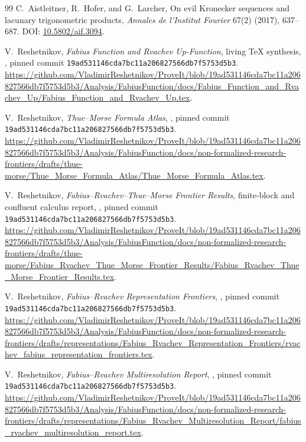 \documentclass[11pt,oneside]{article}
\theoremstyle{definition}
\begin{document}
\begin{thebibliography}{99}
C.~Aistleitner, R.~Hofer, and G.~Larcher,
\newblock On evil Kronecker sequences and lacunary trigonometric products,
\newblock \emph{Annales de l'Institut Fourier} 67(2) (2017), 637--687.
\newblock DOI: \href{https://doi.org/10.5802/aif.3094}{10.5802/aif.3094}.

V.~Reshetnikov,
\newblock \emph{Fabius Function and Rvachev Up-Function}, living TeX synthesis,
\newblock \repo, pinned commit
\nolinkurl{19ad531146cda7bc11a206827566db7f5753d5b3}.
\newblock \url{https://github.com/VladimirReshetnikov/ProveIt/blob/19ad531146cda7bc11a206827566db7f5753d5b3/Analysis/FabiusFunction/docs/Fabius_Function_and_Rvachev_Up/Fabius_Function_and_Rvachev_Up.tex}.

V.~Reshetnikov,
\newblock \emph{Thue--Morse Formula Atlas},
\newblock \repo, pinned commit
\nolinkurl{19ad531146cda7bc11a206827566db7f5753d5b3}.
\newblock \url{https://github.com/VladimirReshetnikov/ProveIt/blob/19ad531146cda7bc11a206827566db7f5753d5b3/Analysis/FabiusFunction/docs/non-formalized-research-frontiers/drafts/thue-morse/Thue_Morse_Formula_Atlas/Thue_Morse_Formula_Atlas.tex}.

V.~Reshetnikov,
\newblock \emph{Fabius--Rvachev--Thue--Morse Frontier Results}, finite-block and
confluent calculus report,
\newblock \repo, pinned commit
\nolinkurl{19ad531146cda7bc11a206827566db7f5753d5b3}.
\newblock \url{https://github.com/VladimirReshetnikov/ProveIt/blob/19ad531146cda7bc11a206827566db7f5753d5b3/Analysis/FabiusFunction/docs/non-formalized-research-frontiers/drafts/thue-morse/Fabius_Rvachev_Thue_Morse_Frontier_Results/Fabius_Rvachev_Thue_Morse_Frontier_Results.tex}.

V.~Reshetnikov,
\newblock \emph{Fabius--Rvachev Representation Frontiers},
\newblock \repo, pinned commit
\nolinkurl{19ad531146cda7bc11a206827566db7f5753d5b3}.
\newblock \url{https://github.com/VladimirReshetnikov/ProveIt/blob/19ad531146cda7bc11a206827566db7f5753d5b3/Analysis/FabiusFunction/docs/non-formalized-research-frontiers/drafts/representations/Fabius_Rvachev_Representation_Frontiers/rvachev_fabius_representation_frontiers.tex}.

V.~Reshetnikov,
\newblock \emph{Fabius--Rvachev Multiresolution Report},
\newblock \repo, pinned commit
\nolinkurl{19ad531146cda7bc11a206827566db7f5753d5b3}.
\newblock \url{https://github.com/VladimirReshetnikov/ProveIt/blob/19ad531146cda7bc11a206827566db7f5753d5b3/Analysis/FabiusFunction/docs/non-formalized-research-frontiers/drafts/representations/Fabius_Rvachev_Multiresolution_Report/fabius_rvachev_multiresolution_report.tex}.


\end{thebibliography}
\end{document}

